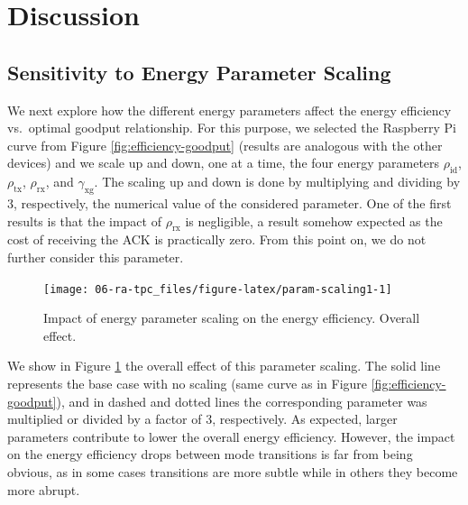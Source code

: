 \documentclass[twoside,nohyper]{tufte-book}
\begin{document}
\hypertarget{discussion}{%
\section{Discussion}\label{discussion}}

\hypertarget{sensitivity-to-energy-parameter-scaling}{%
\subsection{Sensitivity to Energy Parameter Scaling}\label{sensitivity-to-energy-parameter-scaling}}

We next explore how the different energy parameters affect the energy efficiency vs.~optimal goodput relationship. For this purpose, we selected the Raspberry Pi curve from Figure \ref{fig:efficiency-goodput} (results are analogous with the other devices) and we scale up and down, one at a time, the four energy parameters \(\rho_\mathrm{id}\), \(\rho_\mathrm{tx}\), \(\rho_\mathrm{rx}\), and \(\gamma_\mathrm{xg}\). The scaling up and down is done by multiplying and dividing by 3, respectively, the numerical value of the considered parameter. One of the first results is that the impact of \(\rho_\mathrm{rx}\) is negligible, a result somehow expected as the cost of receiving the ACK is practically zero. From this point on, we do not further consider this parameter.



\begin{figure}

{\centering \texttt{[image: 06-ra-tpc\_files/figure-latex/param-scaling1-1]} 

}

\caption[Impact of energy parameter scaling on the energy efficiency. Overall effect.]{Impact of energy parameter scaling on the energy efficiency. Overall effect.}\label{fig:param-scaling1}
\end{figure}

We show in Figure \ref{fig:param-scaling1} the overall effect of this parameter scaling. The solid line represents the base case with no scaling (same curve as in Figure \ref{fig:efficiency-goodput}), and in dashed and dotted lines the corresponding parameter was multiplied or divided by a factor of 3, respectively. As expected, larger parameters contribute to lower the overall energy efficiency. However, the impact on the energy efficiency drops between mode transitions is far from being obvious, as in some cases transitions are more subtle while in others they become more abrupt.
\end{document}
